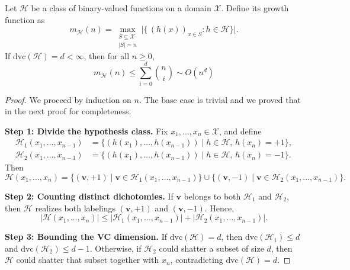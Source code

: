 \documentclass[../main]{subfiles}
\begin{document}
\begin{theorem}
Let $\mathcal{H}$ be a class of binary-valued functions on a domain $\mathcal{X}$.
Define its growth function as
\begin{equation}
    m_{\mathcal{H}}(n)
    = \max_{\substack{S \subseteq \mathcal{X} \\ |S| = n}}
      \bigl|\{\, (h(x))_{x \in S} : h \in \mathcal{H} \}\bigr|.
\end{equation}
If $\mathrm{dvc}(\mathcal{H}) = d < \infty$, then for all $n \ge 0$,
\begin{equation}
    m_{\mathcal{H}}(n)
    \le \sum_{i=0}^{d} \binom{n}{i}\sim O(n^{d})
\end{equation}
\end{theorem}
\begin{proof}
    We proceed by induction on $n$. The base case is trivial and we proved that in the next proof for completeness.
    
    \textbf{Step 1: Divide the hypothesis class.}
    Fix $x_1, \dots, x_n \in \mathcal{X}$, and define
    \begin{align}
        \mathcal{H}_1(x_1,\dots,x_{n-1})
        &= \{ (h(x_1), \dots, h(x_{n-1})) \mid h \in \mathcal{H},\, h(x_n)=+1 \}, \\
        \mathcal{H}_2(x_1,\dots,x_{n-1})
        &= \{ (h(x_1), \dots, h(x_{n-1})) \mid h \in \mathcal{H},\, h(x_n)=-1 \}.
    \end{align}
    Then
    \begin{equation}
        \mathcal{H}(x_1,\dots,x_n)
        = \{ (\mathbf{v}, +1) \mid \mathbf{v} \in \mathcal{H}_1(x_1,\dots,x_{n-1}) \}
          \cup
          \{ (\mathbf{v}, -1) \mid \mathbf{v} \in \mathcal{H}_2(x_1,\dots,x_{n-1}) \}.
    \end{equation}
    
    \textbf{Step 2: Counting distinct dichotomies.}
    If $\mathbf{v}$ belongs to both $\mathcal{H}_1$ and $\mathcal{H}_2$, then $\mathcal{H}$ realizes both labelings $(\mathbf{v}, +1)$ and $(\mathbf{v}, -1)$.  
    Hence,
    \begin{equation}
        |\mathcal{H}(x_1,\dots,x_n)|
        \le |\mathcal{H}_1(x_1,\dots,x_{n-1})|
           + |\mathcal{H}_2(x_1,\dots,x_{n-1})|.
    \end{equation}
    
    \textbf{Step 3: Bounding the VC dimension.}
    If $\mathrm{dvc}(\mathcal{H}) = d$, then $\mathrm{dvc}(\mathcal{H}_1) \le d$ and $\mathrm{dvc}(\mathcal{H}_2) \le d-1$.  
    Otherwise, if $\mathcal{H}_2$ could shatter a subset of size $d$, then $\mathcal{H}$ could shatter that subset together with $x_n$, contradicting $\mathrm{dvc}(\mathcal{H}) = d$.
    

\end{proof}
\end{document}
